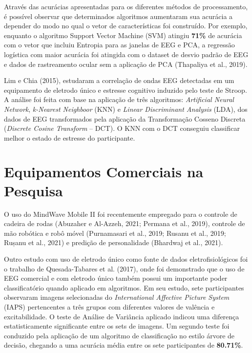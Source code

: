 Através das acurácias apresentadas para os diferentes métodos de processamento, 
é possível observar que determinados algoritmos aumentaram sua acurácia a
 depender do modo no qual o vetor de características foi construído. 
 Por exemplo, enquanto o algoritmo Support Vector Machine (SVM) atingiu \textbf{71\%} de acurácia 
 com o vetor que incluiu Entropia para as janelas de EEG e PCA, a regressão logística com maior acurácia 
 foi atingida com o dataset de desvio padrão de EEG e dados de rastreamento ocular sem a aplicação de PCA 
 (Thapaliya et al., 2019). 

Lim e Chia (2015), estudaram a correlação de ondas EEG detectadas em um equipamento de eletrodo único e 
estresse cognitivo induzido pelo teste de Stroop. A análise foi feita com base na aplicação de três algoritmos: 
\textit{Artificial Neural Network}, \textit{k-Nearest Neighboor} (KNN) e \textit{Linear Discriminant Analysis} (LDA), 
dos dados de EEG transformados pela aplicação da Transformação Cosseno Discreta (\textit{Discrete Cosine Transform} – DCT). 
O KNN com o DCT conseguiu classificar melhor o estado de estresse do participante.

\chapter{Equipamentos Comerciais na Pesquisa}

O uso do MindWave Mobile II foi recentemente empregado para o 
controle de cadeira de rodas (Abuzaher e Al-Azzeh, 2021; Permana et al., 2019), 
controle de mão robótica e robô móvel (Purnamasari et al., 2019; Rusanu et al., 2019; Rușanu et al., 2021) 
e predição de personalidade (Bhardwaj et al., 2021). 

Outro estudo com uso de eletrodo único como fonte de dados eletrofisiológicos foi o trabalho de Quesada-Tabares et al. (2017), 
onde foi demonstrado que o uso de EEG comercial e com eletrodo único também possui um importante poder classificatório 
quando aplicado em algoritmos. Em seu estudo, sete participantes observaram imagens selecionadas do 
\textit{International Affective Picture System} (IAPS) pertencentes a três grupos com diferentes valores de 
valência e excitabilidade. O teste de Análise de Variância aplicado indicou 
uma diferença estatisticamente significante entre os sets de imagens.
 Um segundo teste foi conduzido pela aplicação de um algoritmo de classificação no estilo árvore de decisão,
  chegando a uma acurácia média entre os sete participantes de \textbf{80.71\%}.

